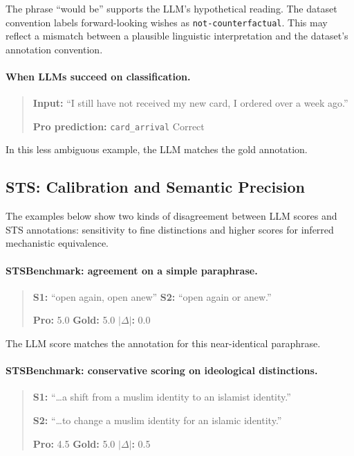 \noindent The phrase ``would be'' supports the LLM's hypothetical reading. The dataset convention labels forward-looking wishes as \texttt{not-counterfactual}.
This may reflect a mismatch between a plausible linguistic interpretation and the dataset's annotation convention.

\paragraph{When LLMs succeed on classification.}
\begin{quote}
\small
\textbf{Input:} ``I still have not received my new card, I ordered over a week ago.''

\textbf{Pro prediction:} \texttt{card\_arrival} \hfill \textcolor{green!60!black}{Correct}
\end{quote}

\noindent In this less ambiguous example, the LLM matches the gold annotation.


\subsection{STS: Calibration and Semantic Precision}

The examples below show two kinds of disagreement between LLM scores and STS annotations: sensitivity to fine distinctions and higher scores for inferred mechanistic equivalence.

\paragraph{STSBenchmark: agreement on a simple paraphrase.}
\begin{quote}
\small
\textbf{S1:} ``open again, open anew'' \quad \textbf{S2:} ``open again or anew.''

\textbf{Pro:} 5.0 \quad \textbf{Gold:} 5.0 \quad \textbf{$|\Delta|$:} 0.0
\end{quote}

\noindent The LLM score matches the annotation for this near-identical paraphrase.

\paragraph{STSBenchmark: conservative scoring on ideological distinctions.}
\begin{quote}
\small
\textbf{S1:} ``\ldots a shift from a muslim identity to an islamist identity.''

\textbf{S2:} ``\ldots to change a muslim identity for an islamic identity.''

\textbf{Pro:} 4.5 \quad \textbf{Gold:} 5.0 \quad \textbf{$|\Delta|$:} 0.5
\end{quote}

